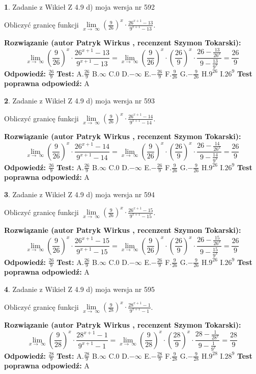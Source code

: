 \documentclass[12pt, a4paper]{article}
\theoremstyle{definition} %
\newtheorem{zad}{}
\newcommand{\zadStart}[1]{\begin{zad}#1\newline}
\newcommand{\zadStop}{\end{zad}}
\newcommand{\rozwStart}[2]{\noindent \textbf{Rozwiązanie (autor #1 , recenzent #2): }\newline}
\newcommand{\rozwStop}{\newline}
\newcommand{\odpStart}{\noindent \textbf{Odpowiedź:}\newline}
\newcommand{\odpStop}{\newline}
\newcommand{\testStart}{\noindent \textbf{Test:}\newline}
\newcommand{\testStop}{\newline}
\newcommand{\kluczStart}{\noindent \textbf{Test poprawna odpowiedź:}\newline}
\newcommand{\kluczStop}{\newline}
\begin{document}
\zadStart{Zadanie z Wikieł Z 4.9 d) moja wersja nr 592}


Obliczyć granicę funkcji  $\lim\limits_{x\to\ \infty}(\frac{9}{26})^{x}\cdot\frac{26^{x+1}-13}{9^{x+1}-13}$.
\zadStop
\rozwStart{Patryk Wirkus}{Szymon Tokarski}
$$\lim\limits_{x\to\ \infty}(\frac{9}{26})^{x}\cdot\frac{26^{x+1}-13}{9^{x+1}-13}=\lim\limits_{x\to\ \infty}(\frac{9}{26})^{x}\cdot(\frac{26}{9})^{x} \cdot \frac{26-\frac{13}{26^{x}}}{9-\frac{13}{9^{x}}} = \frac{26}{9}$$
\rozwStop
\odpStart
$\frac{26}{9}$
\odpStop
\testStart
A.$\frac{26}{9}$ B.$\infty$ C.$0$ D.$-\infty$ E.$-\frac{26}{9}$
F.$\frac{9}{26}$ G.$-\frac{9}{26}$
H.$9^{26}$
I.$26^{9}$
\testStop
\kluczStart
A
\kluczStop



\zadStart{Zadanie z Wikieł Z 4.9 d) moja wersja nr 593}


Obliczyć granicę funkcji  $\lim\limits_{x\to\ \infty}(\frac{9}{26})^{x}\cdot\frac{26^{x+1}-14}{9^{x+1}-14}$.
\zadStop
\rozwStart{Patryk Wirkus}{Szymon Tokarski}
$$\lim\limits_{x\to\ \infty}(\frac{9}{26})^{x}\cdot\frac{26^{x+1}-14}{9^{x+1}-14}=\lim\limits_{x\to\ \infty}(\frac{9}{26})^{x}\cdot(\frac{26}{9})^{x} \cdot \frac{26-\frac{14}{26^{x}}}{9-\frac{14}{9^{x}}} = \frac{26}{9}$$
\rozwStop
\odpStart
$\frac{26}{9}$
\odpStop
\testStart
A.$\frac{26}{9}$ B.$\infty$ C.$0$ D.$-\infty$ E.$-\frac{26}{9}$
F.$\frac{9}{26}$ G.$-\frac{9}{26}$
H.$9^{26}$
I.$26^{9}$
\testStop
\kluczStart
A
\kluczStop



\zadStart{Zadanie z Wikieł Z 4.9 d) moja wersja nr 594}


Obliczyć granicę funkcji  $\lim\limits_{x\to\ \infty}(\frac{9}{26})^{x}\cdot\frac{26^{x+1}-15}{9^{x+1}-15}$.
\zadStop
\rozwStart{Patryk Wirkus}{Szymon Tokarski}
$$\lim\limits_{x\to\ \infty}(\frac{9}{26})^{x}\cdot\frac{26^{x+1}-15}{9^{x+1}-15}=\lim\limits_{x\to\ \infty}(\frac{9}{26})^{x}\cdot(\frac{26}{9})^{x} \cdot \frac{26-\frac{15}{26^{x}}}{9-\frac{15}{9^{x}}} = \frac{26}{9}$$
\rozwStop
\odpStart
$\frac{26}{9}$
\odpStop
\testStart
A.$\frac{26}{9}$ B.$\infty$ C.$0$ D.$-\infty$ E.$-\frac{26}{9}$
F.$\frac{9}{26}$ G.$-\frac{9}{26}$
H.$9^{26}$
I.$26^{9}$
\testStop
\kluczStart
A
\kluczStop



\zadStart{Zadanie z Wikieł Z 4.9 d) moja wersja nr 595}


Obliczyć granicę funkcji  $\lim\limits_{x\to\ \infty}(\frac{9}{28})^{x}\cdot\frac{28^{x+1}-1}{9^{x+1}-1}$.
\zadStop
\rozwStart{Patryk Wirkus}{Szymon Tokarski}
$$\lim\limits_{x\to\ \infty}(\frac{9}{28})^{x}\cdot\frac{28^{x+1}-1}{9^{x+1}-1}=\lim\limits_{x\to\ \infty}(\frac{9}{28})^{x}\cdot(\frac{28}{9})^{x} \cdot \frac{28-\frac{1}{28^{x}}}{9-\frac{1}{9^{x}}} = \frac{28}{9}$$
\rozwStop
\odpStart
$\frac{28}{9}$
\odpStop
\testStart
A.$\frac{28}{9}$ B.$\infty$ C.$0$ D.$-\infty$ E.$-\frac{28}{9}$
F.$\frac{9}{28}$ G.$-\frac{9}{28}$
H.$9^{28}$
I.$28^{9}$
\testStop
\kluczStart
A
\kluczStop
\end{document}

